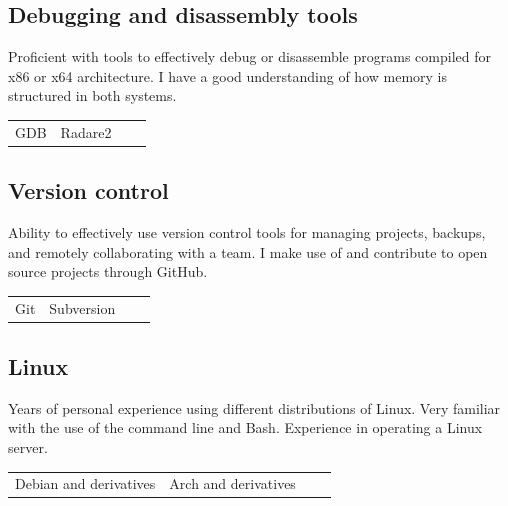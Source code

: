 \documentclass[letterpaper]{article}
\begin{document}
        \subsection*{Debugging and disassembly tools}
        Proficient with tools to effectively debug or disassemble programs compiled for x86 or x64 architecture.
        I have a good understanding of how memory is structured in both systems.

        \begin{center}
        \begin{tabular}{p{} p{} p{} p{}}
            GDB & Radare2 &&\\
        \end{tabular}
        \end{center}

        \subsection*{Version control}
        Ability to effectively use version control tools for managing projects, backups, and remotely collaborating with a team.
        I make use of and contribute to open source projects through GitHub.

        \begin{center}
        \begin{tabular}{p{} p{} p{} p{}}
            Git & Subversion &&\\
        \end{tabular}
        \end{center}

        \subsection*{Linux}

        Years of personal experience using different distributions of Linux.
        Very familiar with the use of the command line and Bash.
        Experience in operating a Linux server.

        \begin{center}
        \begin{tabular}{p{} p{} p{} p{}}
            Debian and derivatives & Arch and derivatives &&\\
        \end{tabular}
        \end{center}
\end{document}
